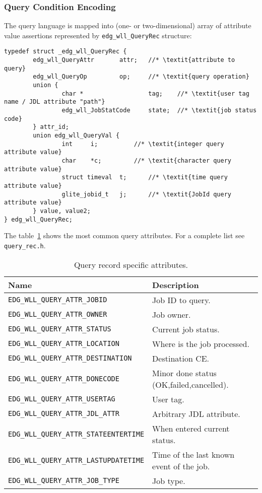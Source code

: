 \subsubsection{Query Condition Encoding}
\label{s:queryrec}
The \LB query language is mapped into (one- or two-dimensional) array
of attribute value assertions represented by
\verb'edg_wll_QueryRec' structure:
\begin{lstlisting}
typedef struct _edg_wll_QueryRec {
        edg_wll_QueryAttr       attr;   //* \textit{attribute to query}
        edg_wll_QueryOp         op;     //* \textit{query operation}
        union {
                char *                  tag;    //* \textit{user tag name / JDL attribute "path"}
                edg_wll_JobStatCode     state;  //* \textit{job status code}
        } attr_id;
        union edg_wll_QueryVal {
                int     i;      	//* \textit{integer query attribute value}
                char    *c;     	//* \textit{character query attribute value}
                struct timeval  t;      //* \textit{time query attribute value}
                glite_jobid_t   j;      //* \textit{JobId query attribute value}
        } value, value2;
} edg_wll_QueryRec;
\end{lstlisting}


The table~\ref{t:cqueryattr} shows the most common query attributes.
For a complete list see \texttt{query\_rec.h}.

\begin{table}[ht]
\begin{tabularx}{\textwidth}{lX}
{\bf Name} & {\bf Description} \\
\hline
\lstinline'EDG_WLL_QUERY_ATTR_JOBID' & Job ID to query. \\
\lstinline'EDG_WLL_QUERY_ATTR_OWNER' & Job owner. \\
\lstinline'EDG_WLL_QUERY_ATTR_STATUS' & Current job status. \\
\lstinline'EDG_WLL_QUERY_ATTR_LOCATION' & Where is the job processed. \\
\lstinline'EDG_WLL_QUERY_ATTR_DESTINATION' & Destination CE. \\
\lstinline'EDG_WLL_QUERY_ATTR_DONECODE' & Minor done status (OK,failed,cancelled). \\
\lstinline'EDG_WLL_QUERY_ATTR_USERTAG' & User tag. \\
\lstinline'EDG_WLL_QUERY_ATTR_JDL_ATTR' & Arbitrary JDL attribute. \\
\lstinline'EDG_WLL_QUERY_ATTR_STATEENTERTIME' & When entered current status. \\
\lstinline'EDG_WLL_QUERY_ATTR_LASTUPDATETIME' & Time of the last known event of the job. \\
\lstinline'EDG_WLL_QUERY_ATTR_JOB_TYPE' & Job type. \\
\end{tabularx}
\caption{Query record specific attributes.}
\label{t:cqueryattr}
\end{table}

